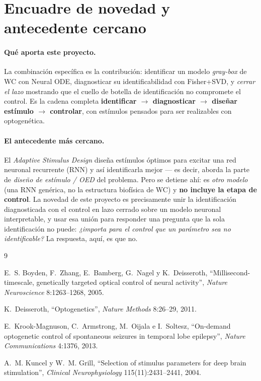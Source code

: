\documentclass[11pt,a4paper]{article}
\begin{document}
\section{Encuadre de novedad y antecedente cercano}

\paragraph{Qué aporta este proyecto.} La combinación específica es la contribución: identificar un modelo \emph{gray-box} de WC con Neural ODE, diagnosticar su identificabilidad con Fisher+SVD, y \emph{cerrar el lazo} mostrando que el cuello de botella de identificación no compromete el control. Es la cadena completa \textbf{identificar $\to$ diagnosticar $\to$ diseñar estímulo $\to$ controlar}, con estímulos pensados para ser realizables con optogenética.

\paragraph{El antecedente más cercano.} El \emph{Adaptive Stimulus Design} diseña estímulos óptimos para excitar una red neuronal recurrente (RNN) y así identificarla mejor --- es decir, aborda la parte de \emph{diseño de estímulo / OED} del problema. Pero se detiene ahí: es \emph{otro modelo} (una RNN genérica, no la estructura biofísica de WC) y \textbf{no incluye la etapa de control}. La novedad de este proyecto es precisamente unir la identificación diagnosticada con el control en lazo cerrado sobre un modelo neuronal interpretable, y usar esa unión para responder una pregunta que la sola identificación no puede: \emph{¿importa para el control que un parámetro sea no identificable?} La respuesta, aquí, es que no.

\begin{thebibliography}{9}

 E.~S. Boyden, F.~Zhang, E.~Bamberg, G.~Nagel y K.~Deisseroth, ``Millisecond-timescale, genetically targeted optical control of neural activity'', \emph{Nature Neuroscience} 8:1263--1268, 2005.

 K.~Deisseroth, ``Optogenetics'', \emph{Nature Methods} 8:26--29, 2011.

 E.~Krook-Magnuson, C.~Armstrong, M.~Oijala e I.~Soltesz, ``On-demand optogenetic control of spontaneous seizures in temporal lobe epilepsy'', \emph{Nature Communications} 4:1376, 2013.

 A.~M. Kuncel y W.~M. Grill, ``Selection of stimulus parameters for deep brain stimulation'', \emph{Clinical Neurophysiology} 115(11):2431--2441, 2004.

\end{thebibliography}
\end{document}
